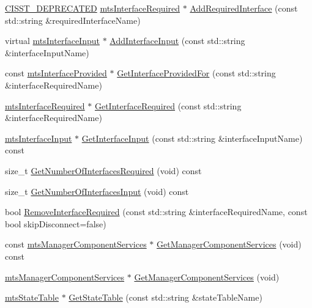 \begin{DoxyCompactItemize}
\item 
\hyperlink{cmn_portability_8h_a63da7164735f9501be651b1f2bbc0121}{C\+I\+S\+S\+T\+\_\+\+D\+E\+P\+R\+E\+C\+A\+T\+E\+D} \hyperlink{classmts_interface_required}{mts\+Interface\+Required} $\ast$ \hyperlink{classmts_component_aa0e3e69d339ddc9f13e39976289b9e0d}{Add\+Required\+Interface} (const std\+::string \&required\+Interface\+Name)
\item 
virtual \hyperlink{classmts_interface_input}{mts\+Interface\+Input} $\ast$ \hyperlink{classmts_component_aa40d8f242fd9f3fe63085bce252affdb}{Add\+Interface\+Input} (const std\+::string \&interface\+Input\+Name)
\item 
const \hyperlink{classmts_interface_provided}{mts\+Interface\+Provided} $\ast$ \hyperlink{classmts_component_a96d97e272bdabf8bbfa3b810a16de379}{Get\+Interface\+Provided\+For} (const std\+::string \&interface\+Required\+Name)
\item 
\hyperlink{classmts_interface_required}{mts\+Interface\+Required} $\ast$ \hyperlink{classmts_component_a2274eb292eda7c34f006e92f92bb77cd}{Get\+Interface\+Required} (const std\+::string \&interface\+Required\+Name)
\item 
\hyperlink{classmts_interface_input}{mts\+Interface\+Input} $\ast$ \hyperlink{classmts_component_adeb03b916eb080ef76d6768903ee7235}{Get\+Interface\+Input} (const std\+::string \&interface\+Input\+Name) const 
\item 
size\+\_\+t \hyperlink{classmts_component_a1e4a567e217c8c36c3f4d76a6dcd64e7}{Get\+Number\+Of\+Interfaces\+Required} (void) const 
\item 
size\+\_\+t \hyperlink{classmts_component_a26deb2a36442f836c8496afca838f878}{Get\+Number\+Of\+Interfaces\+Input} (void) const 
\item 
bool \hyperlink{classmts_component_a8099dc203565dce696c79f68b27a46bc}{Remove\+Interface\+Required} (const std\+::string \&interface\+Required\+Name, const bool skip\+Disconnect=false)
\item 
const \hyperlink{classmts_manager_component_services}{mts\+Manager\+Component\+Services} $\ast$ \hyperlink{classmts_component_a1442cdcee69c626d697cfa8346575e4d}{Get\+Manager\+Component\+Services} (void) const 
\item 
\hyperlink{classmts_manager_component_services}{mts\+Manager\+Component\+Services} $\ast$ \hyperlink{classmts_component_a4c5eeabacb5094e96e323fc458e738b7}{Get\+Manager\+Component\+Services} (void)
\item 
\hyperlink{classmts_state_table}{mts\+State\+Table} $\ast$ \hyperlink{classmts_component_a2f16c864f392c4411f35e57fcc0ef4b7}{Get\+State\+Table} (const std\+::string \&state\+Table\+Name)

\end{DoxyCompactItemize}
